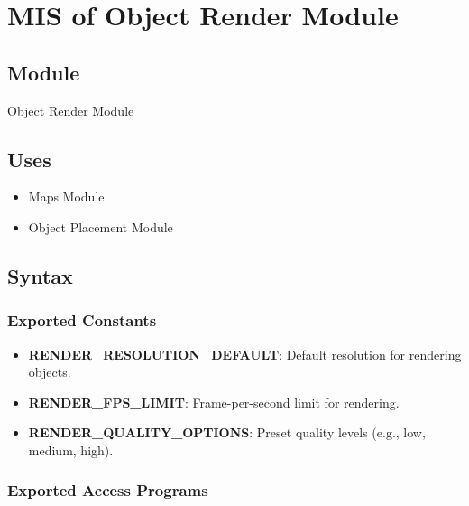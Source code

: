 \documentclass[12pt, titlepage]{article}
\begin{document}
\section{MIS of Object Render Module} \label{ObjectRenderModule}

\subsection{Module}

Object Render Module

\subsection{Uses}

\begin{itemize}
  \item Maps Module
  \item Object Placement Module
\end{itemize}

\subsection{Syntax}

\subsubsection{Exported Constants}

\begin{itemize}
  \item \textbf{RENDER\_RESOLUTION\_DEFAULT}: Default resolution for rendering objects.
  \item \textbf{RENDER\_FPS\_LIMIT}: Frame-per-second limit for rendering.
  \item \textbf{RENDER\_QUALITY\_OPTIONS}: Preset quality levels (e.g., low, medium, high).
\end{itemize}

\subsubsection{Exported Access Programs}
\end{document}
